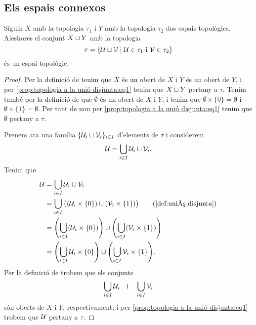 \documentclass[../Apunts.tex]{subfiles}
\begin{document}
	\subsection{Els espais connexos}
	\begin{proposition}
		\label{prop:topologia a la unió disjunta}
		Siguin \(X\) amb la topologia \(\tau_{1}\) i \(Y\) amb la topologia \(\tau_{2}\) dos espais topològics. Aleshores el conjunt \(X\sqcup Y\) amb la topologia
		\begin{equation}
			\label{prop:topologia a la unió disjunta:eq1}
			\tau=\{\mathcal{U}\sqcup\mathcal{V}\mid\mathcal{U}\in\tau_{1}\text{ i }\mathcal{V}\in\tau_{2}\}
		\end{equation}
		és un espai topològic.
		\begin{proof}
			Per la definició de  tenim que \(X\) és un obert de \(X\) i \(Y\) és un obert de \(Y\), i per \eqref{prop:topologia a la unió disjunta:eq1} tenim que \(X\sqcup Y\) pertany a \(\tau\). Tenim també per la definició de  que \(\emptyset\) és un obert de \(X\) i \(Y\), i tenim que \(\emptyset\times\{0\}=\emptyset\) i \(\emptyset\times\{1\}=\emptyset\). Per tant de nou per \eqref{prop:topologia a la unió disjunta:eq1} tenim que \(\emptyset\) pertany a \(\tau\).
			
			Prenem ara una família \(\{\mathcal{U}_{i}\sqcup\mathcal{V}_{i}\}_{i\in I}\) d'elements de \(\tau\) i considerem
			\[\mathcal{U}=\bigcup_{i\in I}\mathcal{U}_{i}\sqcup\mathcal{V}_{i}.\]
			Tenim que
			\begin{align*}
				\obert{U}&=\bigcup_{i\in I}\obert{U}_{i}\uniodisjunta\obert{V}_{i} \\
				&=\bigcup_{i\in I}\big((\obert{U}_{i}\times\{0\})\cup(\obert{V}_{i}\times\{1\})\big) \tag{\ref{def:unió disjunta}} \\
				&=\left(\bigcup_{i\in I}(\obert{U}_{i}\times\{0\})\right)\cup\left(\bigcup_{i\in I}(\obert{V}_{i}\times\{1\})\right) \\
				&=\left(\bigcup_{i\in I}\obert{U}_{i}\times\{0\}\right)\cup\left(\bigcup_{i\in I}\obert{V}_{i}\times\{1\}\right).
			\end{align*}
			Per la definició de  trobem que els conjunts
			\[\bigcup_{i\in I}\mathcal{U}_{i}\quad\text{i}\quad\bigcup_{i\in I}\mathcal{V}_{i}\]
			són oberts de \(X\) i \(Y\), respectivament; i per \eqref{prop:topologia a la unió disjunta:eq1} trobem que \(\mathcal{U}\) pertany a \(\tau\).
			

\end{proof}
\end{proposition}
\end{document}
